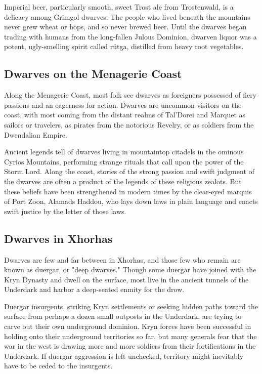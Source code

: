 \documentclass[10pt,a4paper,twoside,bg=print,twocolumn,openany,nodeprecatedcode]{dndbook}
\begin{document}
Imperial beer, particularly smooth, sweet Trost ale from Trostenwald, is a delicacy among Grimgol dwarves. The people who lived beneath the mountains never grew wheat or hops, and so never brewed beer. Until the dwarves began trading with humans from the long-fallen Julous Dominion, dwarven liquor was a potent, ugly-smelling spirit called rütga, distilled from heavy root vegetables.

\subsection{Dwarves on the Menagerie Coast}
Along the Menagerie Coast, most folk see dwarves as foreigners possessed of fiery passions and an eagerness for action. Dwarves are uncommon visitors on the coast, with most coming from the distant realms of Tal'Dorei and Marquet as sailors or travelers, as pirates from the notorious Revelry, or as soldiers from the Dwendalian Empire.

Ancient legends tell of dwarves living in mountaintop citadels in the ominous Cyrios Mountains, performing strange rituals that call upon the power of the Storm Lord. Along the coast, stories of the strong passion and swift judgment of the dwarves are often a product of the legends of these religious zealots. But these beliefs have been strengthened in modern times by the clear-eyed marquis of Port Zoon, Alamads Haddou, who lays down laws in plain language and enacts swift justice by the letter of those laws.

\subsection{Dwarves in Xhorhas}
Dwarves are few and far between in Xhorhas, and those few who remain are known as duergar, or "deep dwarves." Though some duergar have joined with the Kryn Dynasty and dwell on the surface, most live in the ancient tunnels of the Underdark and harbor a deep-seated enmity for the drow.

Duergar insurgents, striking Kryn settlements or seeking hidden paths toward the surface from perhaps a dozen small outposts in the Underdark, are trying to carve out their own underground dominion. Kryn forces have been successful in holding onto their underground territories so far, but many generals fear that the war in the west is drawing more and more soldiers from their fortifications in the Underdark. If duergar aggression is left unchecked, territory might inevitably have to be ceded to the insurgents.
\end{document}
